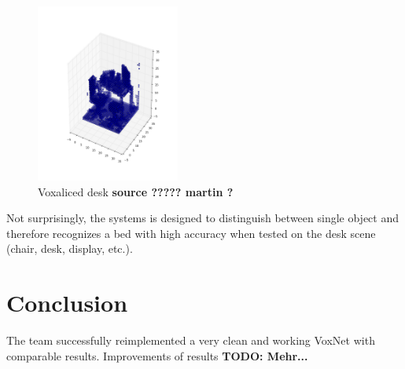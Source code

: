 \documentclass[10pt,twocolumn,letterpaper]{article}
\begin{document}
\begin{figure}[h]
	\label{fig:voxel_desk}
	\centering
	\includegraphics[width=0.42\textwidth]{figures/tango_voxel_desk_scene}
	\caption{Voxaliced desk \textbf{source ????? martin ?}}
\end{figure}

Not surprisingly, the systems is designed to distinguish between single object and therefore recognizes a bed with high accuracy when
tested on the desk scene (chair, desk, display, etc.).

\section{Conclusion}

The team successfully reimplemented a very clean and working VoxNet with comparable results.
Improvements of results 
\textbf{TODO: Mehr...}

{\small


}
\end{document}
